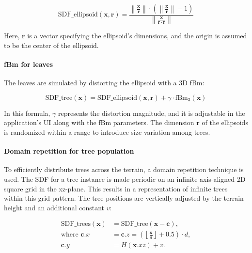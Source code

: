 \begin{equation}
\text{SDF\_ellipsoid}(\mathbf{x}, \mathbf{r}) = \frac{\left\|\frac{\mathbf{x}}{\mathbf{r}}\right\| \cdot \left(\left\|\frac{\mathbf{x}}{\mathbf{r}}\right\| - 1\right)}{\left\|\frac{\mathbf{x}}{\mathbf{r} \cdot \mathbf{r}}\right\|}
\end{equation}

Here, $\mathbf{r}$ is a vector specifying the ellipsoid's dimensions, and the origin is assumed to be the center of the ellipsoid.

\paragraph{fBm for leaves}
The leaves are simulated by distorting the ellipsoid with a 3D fBm:

\begin{equation}
\text{SDF\_tree}(\mathbf{x}) = \text{SDF\_ellipsoid}(\mathbf{x}, \mathbf{r}) + \gamma \cdot \text{fBm}_3(\mathbf{x})
\end{equation}

In this formula, $\gamma$ represents the distortion magnitude, and it is adjustable in the application's UI along with the fBm parameters. The dimension $\mathbf{r}$ of the ellipsoids is randomized within a range to introduce size variation among trees.

\paragraph{Domain repetition for tree population}
To efficiently distribute trees across the terrain, a domain repetition technique is used. The SDF for a tree instance is made periodic on an infinite axis-aligned 2D square grid in the xz-plane. This results in a representation of infinite trees within this grid pattern. The tree positions are vertically adjusted by the terrain height and an additional constant $v$:

\begin{equation}
\begin{aligned}
\text{SDF\_trees}(\mathbf{x}) &= \text{SDF\_tree}(\mathbf{x} - \mathbf{c}), \\
\text{where } \mathbf{c}.x &= \mathbf{c}.z = \left(\left\lfloor \frac{\mathbf{x}}{d} \right\rfloor + 0.5\right) \cdot d, \\
\mathbf{c}.y &= H(\mathbf{x}.{xz}) + v.
\end{aligned}
\end{equation}


